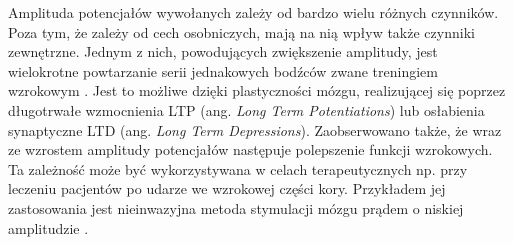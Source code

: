 \documentclass{pracamgr_2}
\begin{document}
	Amplituda potencjałów wywołanych zależy od bardzo wielu różnych czynników. Poza tym, że zależy od cech osobniczych, mają na nią wpływ także czynniki zewnętrzne. Jednym z nich, powodujących zwiększenie amplitudy, jest wielokrotne powtarzanie serii jednakowych bodźców zwane treningiem wzrokowym \citep{hager}. Jest to możliwe dzięki plastyczności mózgu, realizującej się poprzez długotrwałe wzmocnienia LTP (ang. \textit{Long Term Potentiations}) lub osłabienia synaptyczne LTD (ang. \textit{Long Term Depressions}). Zaobserwowano także, że wraz ze wzrostem amplitudy potencjałów następuje polepszenie funkcji wzrokowych. Ta zależność może być wykorzystywana w celach terapeutycznych np. przy leczeniu pacjentów po udarze we wzrokowej części kory. Przykładem jej zastosowania jest nieinwazyjna metoda stymulacji mózgu prądem o niskiej amplitudzie \citep{schulz}. 
	
\end{document}
